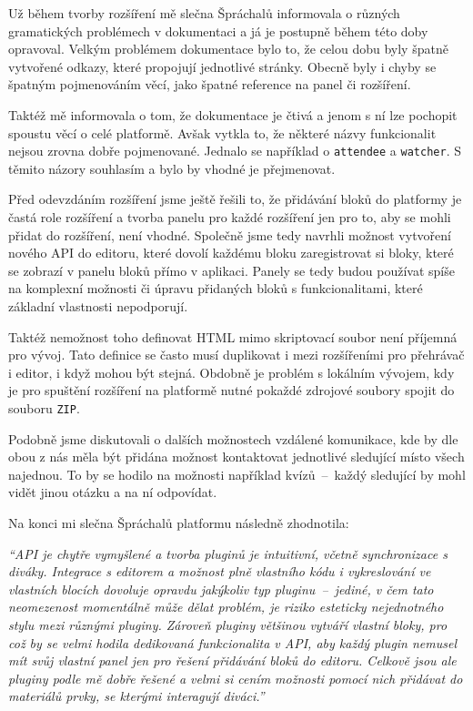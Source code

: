 Už během tvorby rozšíření mě slečna Špráchalů informovala o různých gramatických problémech v dokumentaci a já je postupně během této doby opravoval.
Velkým problémem dokumentace bylo to, že celou dobu byly špatně vytvořené odkazy, které propojují jednotlivé stránky.
Obecně byly i chyby se špatným pojmenováním věcí, jako špatné reference na panel či rozšíření.

Taktéž mě informovala o tom, že dokumentace je čtivá a jenom s ní lze pochopit spoustu věcí o celé platformě.
Avšak vytkla to, že některé názvy funkcionalit nejsou zrovna dobře pojmenované. 
Jednalo se například o \verb|attendee| a \verb|watcher|.
S těmito názory souhlasím a bylo by vhodné je přejmenovat. 

Před odevzdáním rozšíření jsme ještě řešili to, že přidávání bloků do platformy je častá role rozšíření a tvorba panelu pro každé rozšíření jen pro to, aby se mohli přidat do rozšíření, není vhodné.
Společně jsme tedy navrhli možnost vytvoření nového API do editoru, které dovolí každému bloku zaregistrovat si bloky, které se zobrazí v panelu bloků přímo v aplikaci.
Panely se tedy budou používat spíše na komplexní možnosti či úpravu přidaných bloků s funkcionalitami, které základní vlastnosti nepodporují.

Taktéž nemožnost toho definovat HTML mimo skriptovací soubor není příjemná pro vývoj.
Tato definice se často musí duplikovat i mezi rozšířeními pro přehrávač i editor, i když mohou být stejná.
Obdobně je problém s lokálním vývojem, kdy je pro spuštění rozšíření na platformě nutné pokaždé zdrojové soubory spojit do souboru \verb|ZIP|.


Podobně jsme diskutovali o dalších možnostech vzdálené komunikace, kde by dle obou z nás měla být přidána možnost kontaktovat jednotlivé sledující místo všech najednou.
To by se hodilo na možnosti například kvízů~--~každý sledující by mohl vidět jinou otázku a na ní odpovídat.

Na konci mi slečna Špráchalů platformu následně zhodnotila:

\vspace{1em}

\textit{\enquote{API je chytře vymyšlené a tvorba pluginů je intuitivní, včetně synchronizace s diváky. Integrace s editorem a možnost plně vlastního kódu i vykreslování ve vlastních blocích dovoluje opravdu jakýkoliv typ pluginu~--~jediné, v čem tato neomezenost momentálně může dělat problém, je riziko esteticky nejednotného stylu mezi různými pluginy. Zároveň pluginy většinou vytváří vlastní bloky, pro což by se velmi hodila dedikovaná funkcionalita v API, aby každý plugin nemusel mít svůj vlastní panel jen pro řešení přidávání bloků do editoru.
Celkově jsou ale pluginy podle mě dobře řešené a velmi si cením možnosti pomocí nich přidávat do materiálů prvky, se kterými interagují diváci.}}


